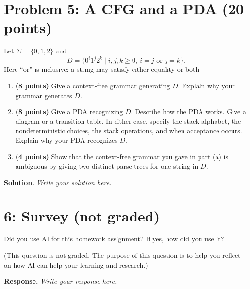 \documentclass[11pt,a4paper]{article}
\begin{document}
\section*{Problem 5: A CFG and a PDA (20 points)}

Let $\Sigma=\{0,1,2\}$ and
\[
    D=\{0^i1^j2^k \mid i,j,k\geq 0,\ i=j\text{ or }j=k\}.
\]
Here ``or'' is inclusive: a string may satisfy either equality or both.

\begin{enumerate}
    \item[(a)] \textbf{(8 points)}
    Give a context-free grammar generating $D$.
    Explain why your grammar generates $D$.
    
    \item[(b)] \textbf{(8 points)}
    Give a PDA recognizing $D$.  Describe how the PDA works. 
    Give a diagram or a transition table. In either case, specify the stack alphabet, the nondeterministic choices, the stack operations, and when acceptance occurs. 
    Explain why your PDA recognizes $D$.

    \item[(c)] \textbf{(4 points)}
    Show that the context-free grammar you gave in part (a) is ambiguous by giving two distinct parse trees for one string in $D$. 
\end{enumerate}

\textbf{Solution.} \textit{Write your solution here.}

\vspace{5em}

\section*{6: Survey (not graded)}

Did you use AI for this homework assignment?
If yes, how did you use it?

(This question is not graded. The purpose of this question is to help you reflect on how AI can help your learning and research.)

\textbf{Response.} \textit{Write your response here.}
\end{document}
